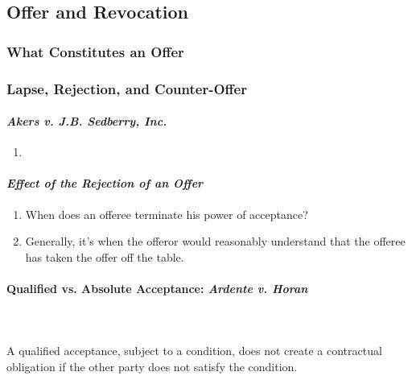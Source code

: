 
\subsection{Offer and Revocation}

\subsubsection{What Constitutes an Offer}


\subsubsection{Lapse, Rejection, and Counter-Offer}

\paragraph{\emph{Akers v. J.B. Sedberry, Inc.}}

\begin{enumerate}
    \item %
\end{enumerate}

\paragraph{\emph{Effect of the Rejection of an Offer}}

\begin{enumerate}
    \item When does an offeree terminate his power of acceptance?
    \item Generally, it's when the offeror would reasonably understand that 
    the offeree has taken the offer off the table.
\end{enumerate}

\paragraph{Qualified vs. Absolute Acceptance: \emph{Ardente v. Horan}}
~\\\\
A qualified acceptance, subject to a condition, does not create a contractual 
obligation if the other party does not satisfy the condition.


